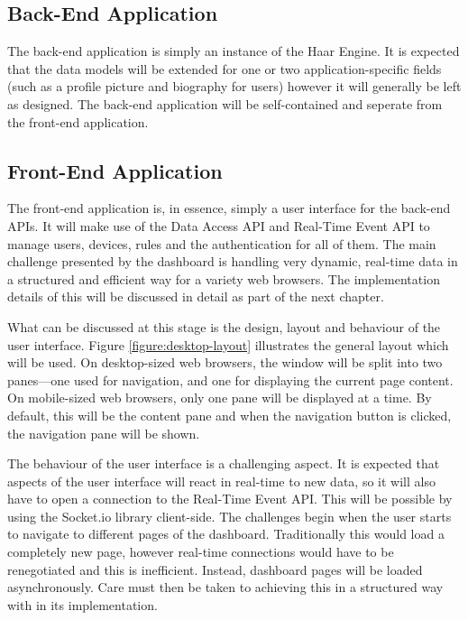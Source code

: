    \subsection{Back-End Application}
      The back-end application is simply an instance of the Haar Engine. It is expected that the data models will be extended for one or two application-specific fields (such as a profile picture and biography for users) however it will generally be left as designed. The back-end application will be self-contained and seperate from the front-end application. 

    \subsection{Front-End Application}
      The front-end application is, in essence, simply a user interface for the back-end APIs. It will make use of the Data Access API and Real-Time Event API to manage users, devices, rules and the authentication for all of them. The main challenge presented by the dashboard is handling very dynamic, real-time data in a structured and efficient way for a variety web browsers. The implementation details of this will be discussed in detail as part of the next chapter.

      What can be discussed at this stage is the design, layout and behaviour of the user interface. Figure \ref{figure:desktop-layout} illustrates the general layout which will be used. On desktop-sized web browsers, the window will be split into two panes---one used for navigation, and one for displaying the current page content. On mobile-sized web browsers, only one pane will be displayed at a time. By default, this will be the content pane and when the navigation button is clicked, the navigation pane will be shown.

      The behaviour of the user interface is a challenging aspect. It is expected that aspects of the user interface will react in real-time to new data, so it will also have to open a connection to the Real-Time Event API. This will be possible by using the Socket.io library client-side. The challenges begin when the user starts to navigate to different pages of the dashboard. Traditionally this would load a completely new page, however real-time connections would have to be renegotiated and this is inefficient. Instead, dashboard pages will be loaded asynchronously. Care must then be taken to achieving this in a structured way with in its implementation.

